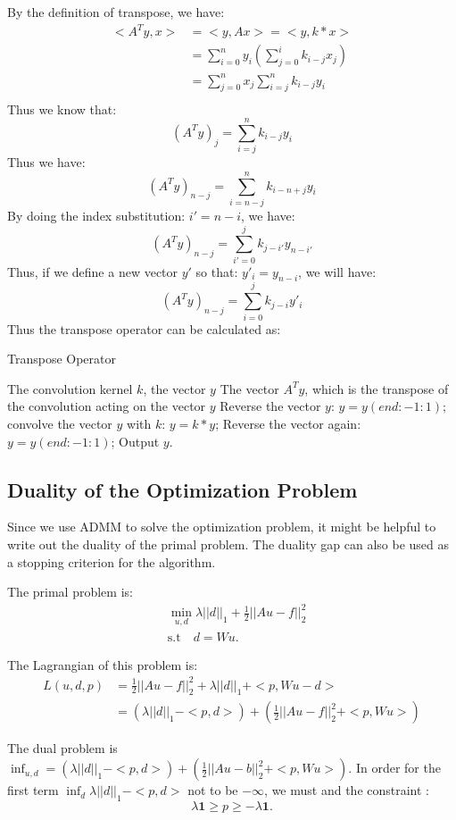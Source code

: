 \documentclass{article}
\theoremstyle{plain} \newtheorem{thm}{Theorem}
\begin{document}
By the definition of transpose, we have:
\begin{align*}
	<A^Ty, x> &= <y, Ax> = <y, k*x>\\
	& = \sum_{i=0}^{n}y_i(\sum_{j=0}^{i}k_{i-j} x_{j})\\
	& = \sum_{j=0}^{n} x_{j} \sum_{i=j}^{n} k_{i-j}y_i\\
\end{align*} 
Thus we know that:
$$(A^Ty)_j = \sum_{i=j}^n k_{i-j}y_i $$
Thus we have:
$$(A^Ty)_{n-j} = \sum_{i=n-j}^n k_{i-n + j}y_i $$
By doing the index substitution: $i' = n - i$, we have:
$$(A^Ty)_{n-j} = \sum_{i'=0}^{j} k_{j-i'}y_{n-i'}$$
Thus, if we define a new vector $y'$ so that: $y'_{i} = y_{n-i}$, we will have:
$$(A^Ty)_{n-j} = \sum_{i=0}^{j} k_{j-i}y'_{i}$$
Thus the transpose operator can be calculated as:
\begin{algorithm}
	\begin{algorithmic}[1]
		\caption{Transpose Operator}
		\Require The convolution kernel $k$, the vector $y$
		\Ensure The vector $A^Ty$, which is the transpose of the convolution acting on the vector $y$
		\State Reverse the vector $y$: $y = y(end:-1:1)$;
		\State convolve the vector $y$ with $k$: $y = k*y$;
		\State Reverse the vector again: $y = y(end:-1:1)$;
		\State Output $y$.
	\end{algorithmic}
\end{algorithm}
\subsection{Duality of the Optimization Problem}
Since we use ADMM to solve the optimization problem, it might be helpful to write out the duality of the primal problem. The duality gap can also be used as a stopping criterion for the algorithm.

The primal problem is:
\begin{align*}
&\min_{u, d} \lambda||d||_1 +\frac{1}{2}||A u - f||_2^2\\
&\text{s.t}\quad d = Wu.
\end{align*}

The Lagrangian of this problem is:
\begin{align*}
	L(u, d, p) & = \frac{1}{2}||Au - f||_2^2 + \lambda ||d||_1 + <p, Wu - d>\\
		& = (\lambda ||d||_1 - <p, d>) + (\frac{1}{2}||Au - f||_2^2 + <p, Wu>) 
\end{align*}

The dual problem is $\inf_{u,d} =  (\lambda ||d||_1 - <p, d>) + (\frac{1}{2}||Au - b||_2^2 + <p, Wu>) $. In order for the first term $\inf_{d} \lambda ||d||_1 - <p, d>$ not to be $-\infty$, we must and the constraint :$$\lambda \mathbf{1} \ge p \ge -\lambda \mathbf{1}.$$
\end{document}
